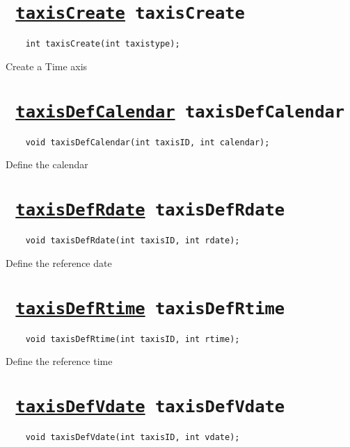 \section*{\texttt{ 
\ifpdf
\hyperref[taxisCreate]{taxisCreate}
\else
taxisCreate
\fi
}}
\begin{verbatim}
    int taxisCreate(int taxistype);
\end{verbatim}

Create a Time axis
\ifpdfoutput{}{(\ref{taxisCreate})}


\section*{\texttt{ 
\ifpdf
\hyperref[taxisDefCalendar]{taxisDefCalendar}
\else
taxisDefCalendar
\fi
}}
\begin{verbatim}
    void taxisDefCalendar(int taxisID, int calendar);
\end{verbatim}

Define the calendar
\ifpdfoutput{}{(\ref{taxisDefCalendar})}


\section*{\texttt{ 
\ifpdf
\hyperref[taxisDefRdate]{taxisDefRdate}
\else
taxisDefRdate
\fi
}}
\begin{verbatim}
    void taxisDefRdate(int taxisID, int rdate);
\end{verbatim}

Define the reference date
\ifpdfoutput{}{(\ref{taxisDefRdate})}


\section*{\texttt{ 
\ifpdf
\hyperref[taxisDefRtime]{taxisDefRtime}
\else
taxisDefRtime
\fi
}}
\begin{verbatim}
    void taxisDefRtime(int taxisID, int rtime);
\end{verbatim}

Define the reference time
\ifpdfoutput{}{(\ref{taxisDefRtime})}


\section*{\texttt{ 
\ifpdf
\hyperref[taxisDefVdate]{taxisDefVdate}
\else
taxisDefVdate
\fi
}}
\begin{verbatim}
    void taxisDefVdate(int taxisID, int vdate);
\end{verbatim}


